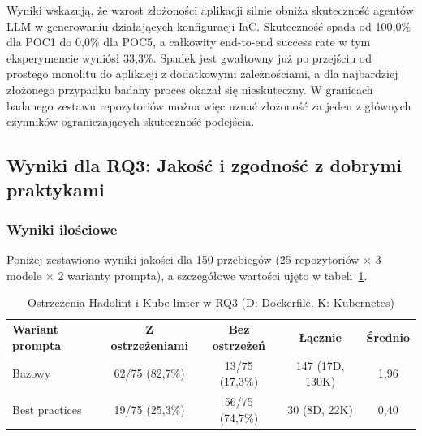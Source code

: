 Wyniki wskazują, że wzrost złożoności aplikacji silnie obniża skuteczność agentów LLM w generowaniu działających konfiguracji IaC. Skuteczność spada od 100{,}0\% dla POC1 do 0{,}0\% dla POC5, a całkowity end-to-end success rate w tym eksperymencie wyniósł 33{,}3\%. Spadek jest gwałtowny już po przejściu od prostego monolitu do aplikacji z dodatkowymi zależnościami, a dla najbardziej złożonego przypadku badany proces okazał się nieskuteczny. W granicach badanego zestawu repozytoriów można więc uznać złożoność za jeden z głównych czynników ograniczających skuteczność podejścia.

\subsection{Wyniki dla RQ3: Jakość i zgodność z dobrymi praktykami}

\subsubsection{Wyniki ilościowe}

Poniżej zestawiono wyniki jakości dla 150 przebiegów (25 repozytoriów $\times$ 3 modele $\times$ 2 warianty prompta), a szczegółowe wartości ujęto w tabeli~\ref{tab:h3-lint-summary}.

\begin{table}[h]
    \centering
    \begin{tabular}{lcccc}
        \textbf{Wariant prompta} & \textbf{Z ostrzeżeniami} & \textbf{Bez ostrzeżeń} & \textbf{Łącznie} & \textbf{Średnio} \\
        Bazowy & 62/75 (82{,}7\%) & 13/75 (17{,}3\%) & 147 (17D, 130K) & 1{,}96 \\
        Best practices & 19/75 (25{,}3\%) & 56/75 (74{,}7\%) & 30 (8D, 22K) & 0{,}40 \\
    \end{tabular}
    \caption{Ostrzeżenia Hadolint i Kube-linter w RQ3 (D: Dockerfile, K: Kubernetes)}
    \label{tab:h3-lint-summary}
\end{table}

